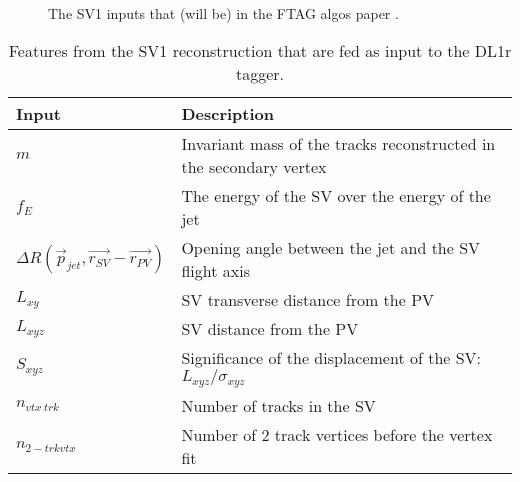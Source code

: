  \begin{figure}[htbp]
        \centering
                  \\ 
        \caption{The SV1 inputs that (will be) in the FTAG algos paper \cite{ANA-FTAG-2019-07}.}
        \label{fig:sv1 inputs}
\end{figure}


\begin{table}[h!]
  \centering
    \begin{tabular}{p{2cm} | p{12cm}  }  
      \textbf{Input} & \textbf{Description}  \\
      \hline
      \hline
  	 $m$ & Invariant mass of the tracks reconstructed in the secondary vertex \\
	 $f_E$ &The energy of the SV over the energy of the jet \\
	 $\Delta R(\vec{p}_{jet},\vec{r_{SV}} - \vec{r_{PV}})$ & Opening angle between the jet and the SV flight axis \\
	 $L_{xy}$ & SV transverse distance from the PV \\
	 $L_{xyz}$ & SV distance from the PV \\
 	 $S_{xyz}$ & Significance of the displacement of the SV: $L_{xyz} / \sigma_{xyz}$ \\
	$n_{vtx \ trk}$ & Number of tracks in the SV \\
	$n_{2-trk vtx}$ & Number of 2 track vertices before the vertex fit \\
    \end{tabular}
    \caption{Features from the SV1 reconstruction that are fed as input to the DL1r tagger.}
    \label{table:jf-inputs}
\end{table}

